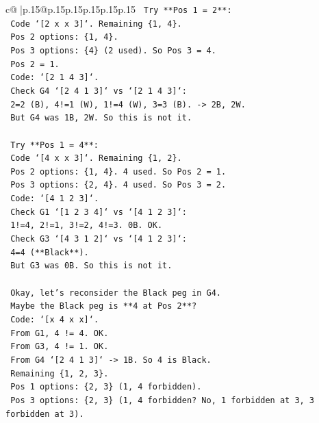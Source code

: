 \documentclass{article}
\begin{document}
{\begin{supertabular}{c@{$\;$}|p{.15\linewidth}@{}p{.15\linewidth}p{.15\linewidth}p{.15\linewidth}p{.15\linewidth}p{.15\linewidth}}
{{{\texttt{    Try **Pos 1 = 2**:} \\
\texttt{    Code `{[}2 x x 3{]}`. Remaining \{1, 4\}.} \\
\texttt{    Pos 2 options: \{1, 4\}.} \\
\texttt{    Pos 3 options: \{4\} (2 used). So Pos 3 = 4.} \\
\texttt{    Pos 2 = 1.} \\
\texttt{    Code: `{[}2 1 4 3{]}`.} \\
\texttt{    Check G4 `{[}2 4 1 3{]}` vs `{[}2 1 4 3{]}`:} \\
\texttt{    2=2 (B), 4!=1 (W), 1!=4 (W), 3=3 (B). {-}> 2B, 2W.} \\
\texttt{    But G4 was 1B, 2W. So this is not it.} \\
\\ 
\texttt{    Try **Pos 1 = 4**:} \\
\texttt{    Code `{[}4 x x 3{]}`. Remaining \{1, 2\}.} \\
\texttt{    Pos 2 options: \{1, 4\}. 4 used. So Pos 2 = 1.} \\
\texttt{    Pos 3 options: \{2, 4\}. 4 used. So Pos 3 = 2.} \\
\texttt{    Code: `{[}4 1 2 3{]}`.} \\
\texttt{    Check G1 `{[}1 2 3 4{]}` vs `{[}4 1 2 3{]}`:} \\
\texttt{    1!=4, 2!=1, 3!=2, 4!=3. 0B. OK.} \\
\texttt{    Check G3 `{[}4 3 1 2{]}` vs `{[}4 1 2 3{]}`:} \\
\texttt{    4=4 (**Black**).} \\
\texttt{    But G3 was 0B. So this is not it.} \\
\\ 
\texttt{    Okay, let's reconsider the Black peg in G4.} \\
\texttt{    Maybe the Black peg is **4 at Pos 2**?} \\
\texttt{    Code: `{[}x 4 x x{]}`.} \\
\texttt{    From G1, 4 != 4. OK.} \\
\texttt{    From G3, 4 != 1. OK.} \\
\texttt{    From G4 `{[}2 4 1 3{]}` {-}> 1B. So 4 is Black.} \\
\texttt{    Remaining \{1, 2, 3\}.} \\
\texttt{    Pos 1 options: \{2, 3\} (1, 4 forbidden).} \\
\texttt{    Pos 3 options: \{2, 3\} (1, 4 forbidden? No, 1 forbidden at 3, 3 forbidden at 3).} \\
}}}
\end{supertabular}}
\end{document}
